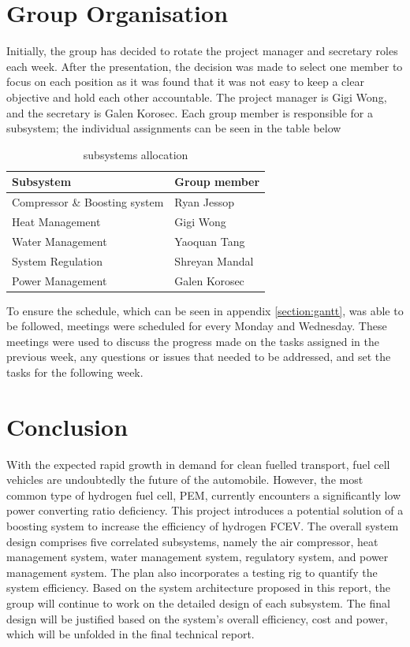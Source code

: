 \documentclass[a4paper,11pt]{article}
\begin{document}
\section{Group Organisation}
Initially, the group has decided to rotate the project manager and secretary roles each week. After the presentation, the decision was made to select one member to focus on each position as it was found that it was not easy to keep a clear objective and hold each other accountable. The project manager is Gigi Wong, and the secretary is Galen Korosec. Each group member is responsible for a subsystem; the individual assignments can be seen in the table below

\begin{table}[h!]
    \centering
    \begin{tabular}{|l|l|}%
    \hline
    \textbf{Subsystem} & \textbf{Group member} \\ [0.5ex] 
    \hline
    Compressor \& Boosting system & Ryan Jessop \\
    Heat Management & Gigi Wong \\
    Water Management & Yaoquan Tang \\
    System Regulation & Shreyan Mandal \\
    Power Management & Galen Korosec \\
    \hline
    \end{tabular}
    \caption{subsystems allocation}
    \label{tab:groupworkassignments}
\end{table}

To ensure the schedule, which can be seen in appendix \ref{section:gantt}, was able to be followed, meetings were scheduled for every Monday and Wednesday. These meetings were used to discuss the progress made on the tasks assigned in the previous week, any questions or issues that needed to be addressed, and set the tasks for the following week.

\section{Conclusion}
With the expected rapid growth in demand for clean fuelled transport, fuel cell vehicles are undoubtedly the future of the automobile. However, the most common type of hydrogen fuel cell, PEM, currently encounters a significantly low power converting ratio deficiency. This project introduces a potential solution of a boosting system to increase the efficiency of hydrogen FCEV. The overall system design comprises five correlated subsystems, namely the air compressor, heat management system, water management system, regulatory system, and power management system. The plan also incorporates a testing rig to quantify the system efficiency.
Based on the system architecture proposed in this report, the group will continue to work on the detailed design of each subsystem. The final design will be justified based on the system's overall efficiency, cost and power, which will be unfolded in the final technical report.\newline
\end{document}
